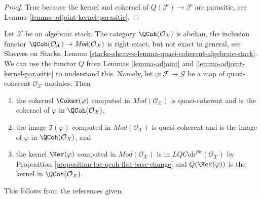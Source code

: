 \begin{proof}
True because the kernel and cokernel of $Q(\mathcal{F}) \to \mathcal{F}$
are parasitic, see Lemma \ref{lemma-adjoint-kernel-parasitic}.
\end{proof}

\begin{remark}
\label{remark-QCoh-abelian}
Let $\mathcal{X}$ be an algebraic stack. The category
$\QCoh(\mathcal{O}_\mathcal{X})$ is abelian, the inclusion functor
$\QCoh(\mathcal{O}_\mathcal{X}) \to \textit{Mod}(\mathcal{O}_\mathcal{X})$
is right exact, but not exact in general, see Sheaves on Stacks, Lemma
\ref{stacks-sheaves-lemma-quasi-coherent-algebraic-stack}.
We can use the functor $Q$ from
Lemmas \ref{lemma-adjoint} and \ref{lemma-adjoint-kernel-parasitic}
to understand this. Namely, let $\varphi : \mathcal{F} \to \mathcal{G}$
be a map of quasi-coherent $\mathcal{O}_\mathcal{X}$-modules. Then
\begin{enumerate}
\item the cokernel $\Coker(\varphi)$ computed in
$\textit{Mod}(\mathcal{O}_\mathcal{X})$ is quasi-coherent and
is the cokernel of $\varphi$ in $\QCoh(\mathcal{O}_\mathcal{X})$,
\item the image $\Im(\varphi)$ computed in
$\textit{Mod}(\mathcal{O}_\mathcal{X})$ is quasi-coherent and
is the image of $\varphi$ in $\QCoh(\mathcal{O}_\mathcal{X})$, and
\item the kernel $\Ker(\varphi)$ computed in
$\textit{Mod}(\mathcal{O}_\mathcal{X})$
is in $\textit{LQCoh}^{fbc}(\mathcal{O}_\mathcal{X})$
by Proposition \ref{proposition-loc-qcoh-flat-base-change} and
$Q(\Ker(\varphi))$ is the kernel in $\QCoh(\mathcal{O}_\mathcal{X})$.
\end{enumerate}
This follows from the references given.
\end{remark}

